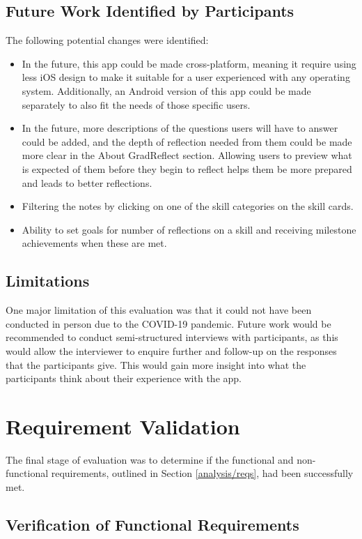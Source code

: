 \documentclass{l4proj}
\begin{document}
\subsection{Future Work Identified by Participants}
The following potential changes were identified:
\begin{itemize}
    \item In the future, this app could be made cross-platform, meaning it require using less iOS design to make it suitable for a user experienced with any operating system. Additionally, an Android version of this app could be made separately to also fit the needs of those specific users. 
    \item In the future, more descriptions of the questions users will have to answer could be added, and the depth of reflection needed from them could be made more clear in the About GradReflect section. Allowing users to preview what is expected of them before they begin to reflect helps them be more prepared and leads to better reflections.
    \item Filtering the notes by clicking on one of the skill categories on the skill cards.
    \item Ability to set goals for number of reflections on a skill and receiving milestone achievements when these are met.

\end{itemize}

\subsection{Limitations}
One major limitation of this evaluation was that it could not have been conducted in person due to the COVID-19 pandemic. Future work would be recommended to conduct semi-structured interviews with participants, as this would allow the interviewer to enquire further and follow-up on the responses that the participants give. This would  gain more insight into what the participants think about their experience with the app.

\section{Requirement Validation}

The final stage of evaluation was to determine if the functional and non-functional requirements, outlined in Section \ref{analysis/reqs}, had been successfully met. 

\subsection{Verification of Functional Requirements}
\end{document}
